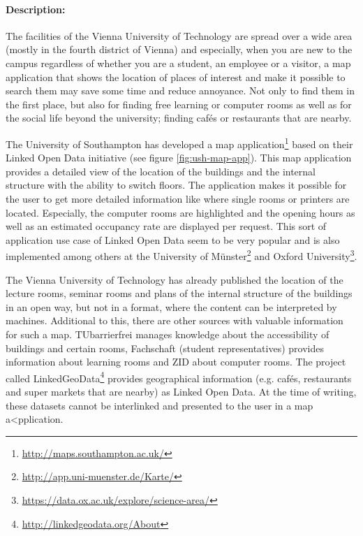 \documentclass{article}
\begin{document}
\paragraph{Description:}
The facilities of the Vienna University of Technology are spread over a wide area (mostly in the fourth district of Vienna) and especially, when you are new to the campus regardless of whether you are a student, an employee or a visitor, a map application that
shows the location of places of interest and make it possible to search them may save some time and reduce annoyance. Not only to find them in the first place, but also for finding free learning or computer rooms as well as for the social life beyond the university; finding cafés or restaurants that are nearby.

The University of Southampton has developed a map application\footnote{\url{http://maps.southampton.ac.uk/}} based on their Linked Open Data initiative (see figure \ref{fig:ush-map-app}). This map application provides a detailed view of the location of the buildings and the internal structure with the ability to switch floors. The application makes it possible for the user to get more detailed information like where single rooms or printers are located. Especially, the computer rooms are highlighted and the opening hours as well as an estimated occupancy rate are displayed per request. This sort of application use case of Linked Open Data seem to be very popular and is also implemented among others at the University of Münster\footnote{\url{http://app.uni-muenster.de/Karte/}} and Oxford University\footnote{\url{https://data.ox.ac.uk/explore/science-area/}}.

The Vienna University of Technology has already published the location of the lecture rooms, seminar rooms and plans of the internal structure of the buildings in an open way, but not in a format, where the content can be interpreted by machines. Additional to this, there are other sources with valuable information for such a map. TUbarrierfrei manages knowledge about the accessibility of buildings and certain rooms, Fachschaft (student representatives) provides information about learning rooms and ZID about computer rooms. The project called LinkedGeoData\footnote{\url{http://linkedgeodata.org/About}} provides geographical information (e.g. cafés, restaurants and super markets that are nearby) as Linked Open Data. At the time of writing, these datasets cannot be interlinked and presented to the user in a map a<pplication.
\end{document}
